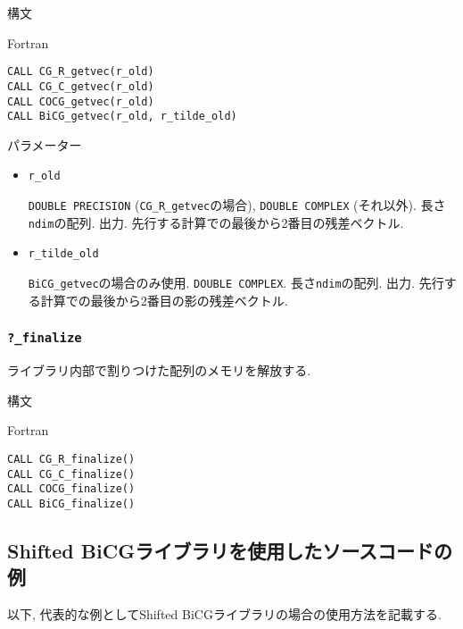 \documentclass[12pt,titlepage]{jarticle}
\begin{document}
\noindent 構文

\noindent Fortran
\begin{verbatim}
CALL CG_R_getvec(r_old)
CALL CG_C_getvec(r_old)
CALL COCG_getvec(r_old)
CALL BiCG_getvec(r_old, r_tilde_old)
\end{verbatim}

\noindent パラメーター

\begin{itemize}
  
\item \verb|r_old|

  \verb|DOUBLE PRECISION| (\verb|CG_R_getvec|の場合),
  \verb|DOUBLE COMPLEX| (それ以外).
  長さ\verb|ndim|の配列. 出力.
  先行する計算での最後から2番目の残差ベクトル.

\item \verb|r_tilde_old|

  \verb|BiCG_getvec|の場合のみ使用.
  \verb|DOUBLE COMPLEX|.
  長さ\verb|ndim|の配列. 出力.
  先行する計算での最後から2番目の影の残差ベクトル.

\end{itemize}

\subsubsection{\texttt{?\_finalize}}

ライブラリ内部で割りつけた配列のメモリを解放する.

\noindent 構文

\noindent Fortran
\begin{verbatim}
CALL CG_R_finalize()
CALL CG_C_finalize()
CALL COCG_finalize()
CALL BiCG_finalize()
\end{verbatim}

\subsection{Shifted BiCGライブラリを使用したソースコードの例}

以下, 代表的な例としてShifted BiCGライブラリの場合の使用方法を記載する. 
\end{document}
